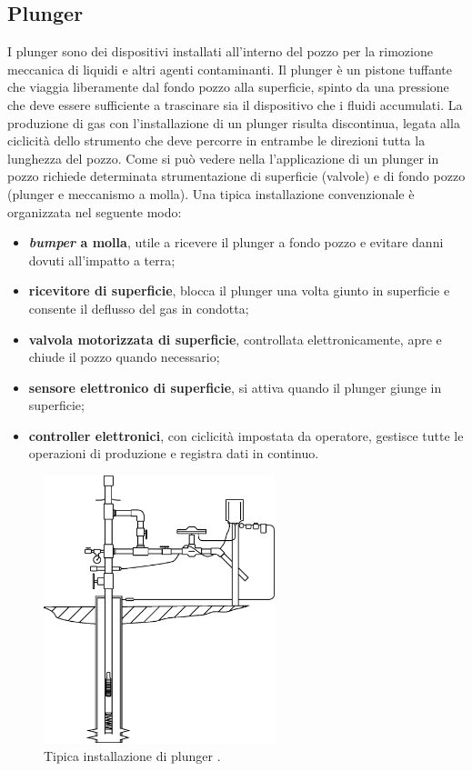 \subsection{Plunger}
I plunger sono dei dispositivi installati all'interno del pozzo per la rimozione meccanica di liquidi e altri agenti contaminanti. Il plunger è un pistone tuffante che viaggia liberamente dal fondo pozzo alla superficie, spinto da una pressione che deve essere sufficiente a trascinare sia il dispositivo che i fluidi accumulati. La produzione di gas con l'installazione di un plunger risulta discontinua, legata alla ciclicità dello strumento che deve percorre in entrambe le direzioni tutta la lunghezza del pozzo. Come si può vedere nella  l'applicazione di un plunger in pozzo richiede determinata strumentazione di superficie (valvole) e di fondo pozzo (plunger e meccanismo a molla). Una tipica installazione convenzionale è organizzata nel seguente modo:

\begin{itemize}
    \item \textbf{\textit{bumper} a molla}, utile a ricevere il plunger a fondo pozzo e evitare danni dovuti all'impatto a terra;
    \item \textbf{ricevitore di superficie}, blocca il plunger una volta giunto in superficie e consente il deflusso del gas in condotta;
    \item \textbf{valvola motorizzata di superficie}, controllata elettronicamente, apre e chiude il pozzo quando necessario;
    \item \textbf{sensore elettronico di superficie}, si attiva quando il plunger giunge in superficie;
    \item \textbf{controller elettronici}, con ciclicità impostata da operatore, gestisce tutte le operazioni di produzione e registra dati in continuo.
\end{itemize}

\begin{figure}[htbp]
    \centering
    \includegraphics[width=0.6\textwidth]{fig/foamer/plunger-installation.eps}
    \caption{Tipica installazione di plunger \parencite{lea2011gas}.}
    \label{fig:plunger-installation}
\end{figure}

